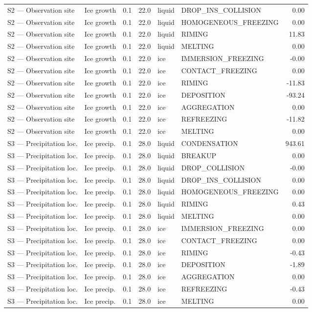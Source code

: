 \begin{table}[p]
{\begin{tabular}{llrrllr}
S2 — Observation site & Ice growth & 0.1 & 22.0 & liquid & DROP\_INS\_COLLISION & 0.00 \\
S2 — Observation site & Ice growth & 0.1 & 22.0 & liquid & HOMOGENEOUS\_FREEZING & 0.00 \\
S2 — Observation site & Ice growth & 0.1 & 22.0 & liquid & RIMING & 11.83 \\
S2 — Observation site & Ice growth & 0.1 & 22.0 & liquid & MELTING & 0.00 \\
S2 — Observation site & Ice growth & 0.1 & 22.0 & ice & IMMERSION\_FREEZING & -0.00 \\
S2 — Observation site & Ice growth & 0.1 & 22.0 & ice & CONTACT\_FREEZING & 0.00 \\
S2 — Observation site & Ice growth & 0.1 & 22.0 & ice & RIMING & -11.83 \\
S2 — Observation site & Ice growth & 0.1 & 22.0 & ice & DEPOSITION & -93.24 \\
S2 — Observation site & Ice growth & 0.1 & 22.0 & ice & AGGREGATION & 0.00 \\
S2 — Observation site & Ice growth & 0.1 & 22.0 & ice & REFREEZING & -11.82 \\
S2 — Observation site & Ice growth & 0.1 & 22.0 & ice & MELTING & 0.00 \\
S3 — Precipitation loc. & Ice precip. & 0.1 & 28.0 & liquid & CONDENSATION & 943.61 \\
S3 — Precipitation loc. & Ice precip. & 0.1 & 28.0 & liquid & BREAKUP & 0.00 \\
S3 — Precipitation loc. & Ice precip. & 0.1 & 28.0 & liquid & DROP\_COLLISION & -0.00 \\
S3 — Precipitation loc. & Ice precip. & 0.1 & 28.0 & liquid & DROP\_INS\_COLLISION & 0.00 \\
S3 — Precipitation loc. & Ice precip. & 0.1 & 28.0 & liquid & HOMOGENEOUS\_FREEZING & 0.00 \\
S3 — Precipitation loc. & Ice precip. & 0.1 & 28.0 & liquid & RIMING & 0.43 \\
S3 — Precipitation loc. & Ice precip. & 0.1 & 28.0 & liquid & MELTING & 0.00 \\
S3 — Precipitation loc. & Ice precip. & 0.1 & 28.0 & ice & IMMERSION\_FREEZING & 0.00 \\
S3 — Precipitation loc. & Ice precip. & 0.1 & 28.0 & ice & CONTACT\_FREEZING & 0.00 \\
S3 — Precipitation loc. & Ice precip. & 0.1 & 28.0 & ice & RIMING & -0.43 \\
S3 — Precipitation loc. & Ice precip. & 0.1 & 28.0 & ice & DEPOSITION & -1.89 \\
S3 — Precipitation loc. & Ice precip. & 0.1 & 28.0 & ice & AGGREGATION & 0.00 \\
S3 — Precipitation loc. & Ice precip. & 0.1 & 28.0 & ice & REFREEZING & -0.43 \\
S3 — Precipitation loc. & Ice precip. & 0.1 & 28.0 & ice & MELTING & 0.00 \\
\hline
\end{tabular}
}
\end{table}
